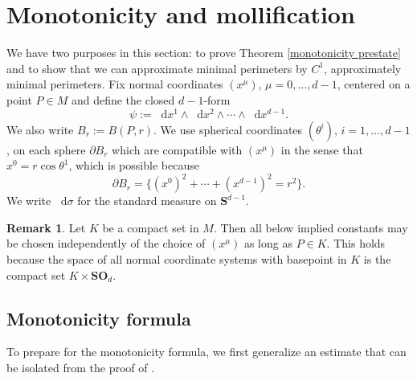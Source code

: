 \documentclass[reqno,12pt,letterpaper]{amsart}
\newcommand{\Sph}{\mathbf S}
\newcommand{\SpOrth}{\mathbf{SO}}
\newcommand*\dif{\mathop{}\!\mathrm{d}}
\theoremstyle{definition}
\newtheorem{remark}[theorem]{Remark}
\numberwithin{equation}{section}
\begin{document}
\section{Monotonicity and mollification}\label{MollifierSection}
We have two purposes in this section: to prove Theorem \ref{monotonicity prestate} and to show that we can approximate minimal perimeters by $C^1$, approximately minimal perimeters.
Fix normal coordinates $(x^\mu)$, $\mu = 0, \dots, d - 1$, centered on a point $P \in M$ and define the closed $d-1$-form
\begin{equation}\label{d1 form}
\psi := \dif x^1 \wedge \dif x^2 \wedge \cdots \wedge \dif x^{d - 1}.
\end{equation}
We also write $B_r := B(P, r)$.
We use spherical coordinates $(\theta^i)$, $i = 1, \dots, d - 1$, on each sphere $\partial B_r$ which are compatible with $(x^\mu)$ in the sense that $x^0 = r \cos \theta^1$, which is possible because
\begin{equation}\label{partial Br is a variety}
\partial B_r = \{(x^0)^2 + \cdots + (x^{d - 1})^2 = r^2\}.
\end{equation}
We write $\dif \sigma$ for the standard measure on $\Sph^{d - 1}$.

\begin{remark}\label{independence of constants}
Let $K$ be a compact set in $M$.
Then all below implied constants may be chosen independently of the choice of $(x^\mu)$ as long as $P \in K$.
This holds because the space of all normal coordinate systems with basepoint in $K$ is the compact set $K \times \SpOrth_d$.
\end{remark}

\subsection{Monotonicity formula}
To prepare for the monotonicity formula, we first generalize an estimate that can be isolated from the proof of \cite[Lemma 5.8]{Giusti77}.
\end{document}
